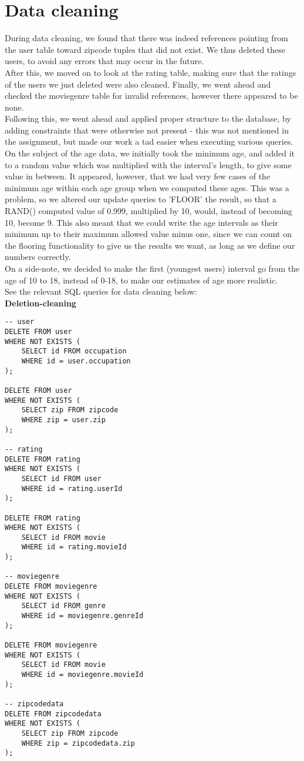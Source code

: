 \section*{Data cleaning}

During data cleaning, we found that there was indeed references pointing from the user table toward zipcode tuples that did not exist. We thus deleted these users, to avoid any errors that may occur in the future. \\
After this, we moved on to look at the rating table, making sure that the ratings of the users we just deleted were also cleaned. Finally, we went ahead and checked the moviegenre table for invalid references, however there appeared to be none. \\
Following this, we went ahead and applied proper structure to the database, by adding constraints that were otherwise not present - this was not mentioned in the assignment, but made our work a tad easier when executing various queries. \\
On the subject of the age data, we initially took the minimum age, and added it to a random value which was multiplied with the interval's length, to give some value in between. It appeared, however, that we had very few cases of the minimum age within each age group when we computed these ages. This was a problem, so we altered our update queries to 'FLOOR' the result, so that a RAND() computed value of 0.999, multiplied by 10, would, instead of becoming 10, become 9. This also meant that we could write the age intervals as their minimum up to their maximum allowed value minus one, since we can count on the flooring functionality to give us the results we want, as long as we define our numbers correctly. \\
On a side-note, we decided to make the first (youngest users) interval go from the age of 10 to 18, instead of 0-18, to make our estimates of age more realistic. \\
See the relevant SQL queries for data cleaning below: \\


\textbf{Deletion-cleaning}
\begin{lstlisting}
-- user
DELETE FROM user
WHERE NOT EXISTS (
	SELECT id FROM occupation
	WHERE id = user.occupation
);

DELETE FROM user
WHERE NOT EXISTS (
	SELECT zip FROM zipcode
	WHERE zip = user.zip
);

-- rating
DELETE FROM rating
WHERE NOT EXISTS (
	SELECT id FROM user
	WHERE id = rating.userId
);

DELETE FROM rating
WHERE NOT EXISTS (
	SELECT id FROM movie
	WHERE id = rating.movieId
);

-- moviegenre
DELETE FROM moviegenre
WHERE NOT EXISTS (
	SELECT id FROM genre
	WHERE id = moviegenre.genreId
);

DELETE FROM moviegenre
WHERE NOT EXISTS (
	SELECT id FROM movie
	WHERE id = moviegenre.movieId
);

-- zipcodedata
DELETE FROM zipcodedata
WHERE NOT EXISTS (
	SELECT zip FROM zipcode
	WHERE zip = zipcodedata.zip
);
\end{lstlisting}

